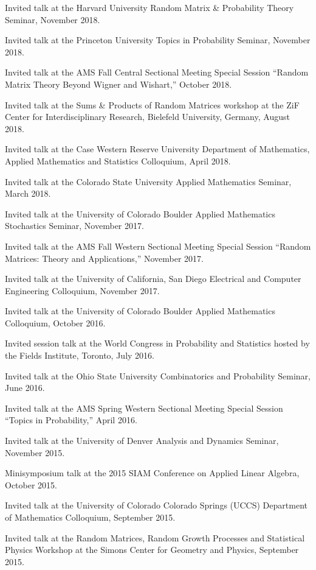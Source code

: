 \documentclass[letterpaper]{article}
\renewenvironment{itemize}{
  \begin{list}{}{
    \setlength{\leftmargin}{1em}
  }
}{
  \end{list}
}
\begin{document}
\begin{itemize}
	\item Invited talk at the Harvard University Random Matrix \& Probability Theory Seminar, November 2018.  
	\item Invited talk at the Princeton University Topics in Probability Seminar, November 2018.  
	\item Invited talk at the AMS Fall Central Sectional Meeting Special Session ``Random Matrix Theory Beyond Wigner and Wishart,'' October 2018.  
	\item Invited talk at the Sums \& Products of Random Matrices workshop at the ZiF Center for Interdisciplinary Research, Bielefeld University, Germany, August 2018.
	\item Invited talk at the Case Western Reserve University Department of Mathematics, Applied Mathematics and Statistics Colloquium, April 2018.  
	\item Invited talk at the Colorado State University Applied Mathematics Seminar, March 2018.  
	\item Invited talk at the University of Colorado Boulder Applied Mathematics Stochastics Seminar, November 2017.  
	\item Invited talk at the AMS Fall Western Sectional Meeting Special Session ``Random Matrices: Theory and Applications,'' November 2017.  
	\item Invited talk at the University of California, San Diego Electrical and Computer Engineering Colloquium, November 2017.  
	\item Invited talk at the University of Colorado Boulder Applied Mathematics Colloquium, October 2016.  
	\item Invited session talk at the World Congress in Probability and Statistics hosted by the Fields Institute, Toronto, July 2016.
	\item Invited talk at the Ohio State University Combinatorics and Probability Seminar, June 2016.
	\item Invited talk at the AMS Spring Western Sectional Meeting Special Session ``Topics in Probability,'' April 2016.  
	\item Invited talk at the University of Denver Analysis and Dynamics Seminar, November 2015.  
	\item Minisymposium talk at the 2015 SIAM Conference on Applied Linear Algebra, October 2015.  
	\item Invited talk at the University of Colorado Colorado Springs (UCCS) Department of Mathematics Colloquium, September 2015.
	\item Invited talk at the Random Matrices, Random Growth Processes and Statistical Physics Workshop at the Simons Center for Geometry and Physics, September 2015.

\end{itemize}
\end{document}
